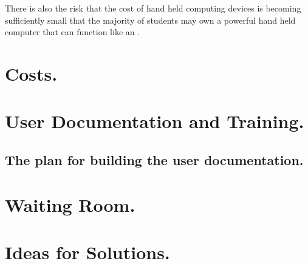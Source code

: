 There is also the risk that the cost of hand held computing devices is becoming sufficiently small that the majority of students may own a powerful hand held computer that can function like an \iDesk.

\section{Costs.}

\NA

\section{User Documentation and Training.}

\subsection{The plan for building the user documentation.}

\NA

\section{Waiting Room.}

\NA

\section{Ideas for Solutions.}

\NA

\bye
